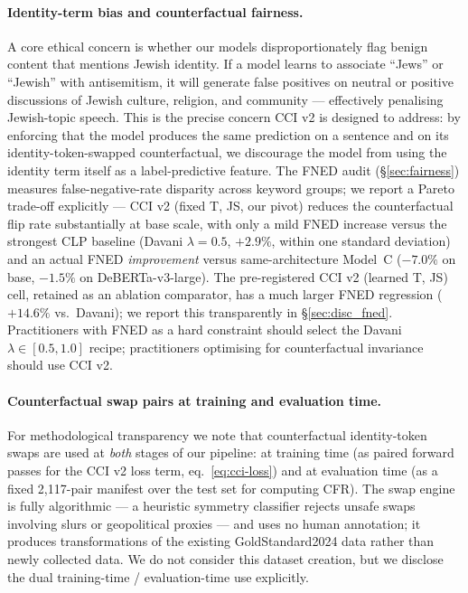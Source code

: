\paragraph{Identity-term bias and counterfactual fairness.}
A core ethical concern is whether our models disproportionately flag benign content that mentions Jewish identity. If a model learns to associate ``Jews'' or ``Jewish'' with antisemitism, it will generate false positives on neutral or positive discussions of Jewish culture, religion, and community --- effectively penalising Jewish-topic speech. This is the precise concern CCI v2 is designed to address: by enforcing that the model produces the same prediction on a sentence and on its identity-token-swapped counterfactual, we discourage the model from using the identity term itself as a label-predictive feature. The FNED audit (\S\ref{sec:fairness}) measures false-negative-rate disparity across keyword groups; we report a Pareto trade-off explicitly --- CCI v2 (fixed T, JS, our pivot) reduces the counterfactual flip rate substantially at base scale, with only a mild FNED increase versus the strongest CLP baseline (Davani $\lambda=0.5$, $+2.9\%$, within one standard deviation) and an actual FNED \emph{improvement} versus same-architecture Model~C ($-7.0\%$ on base, $-1.5\%$ on DeBERTa-v3-large). The pre-registered CCI v2 (learned T, JS) cell, retained as an ablation comparator, has a much larger FNED regression ($+14.6\%$ vs.\ Davani); we report this transparently in \S\ref{sec:disc_fned}. Practitioners with FNED as a hard constraint should select the Davani $\lambda \in [0.5, 1.0]$ recipe; practitioners optimising for counterfactual invariance should use CCI v2.

\paragraph{Counterfactual swap pairs at training and evaluation time.}
For methodological transparency we note that counterfactual identity-token swaps are used at \emph{both} stages of our pipeline: at training time (as paired forward passes for the CCI v2 loss term, eq.~\ref{eq:cci-loss}) and at evaluation time (as a fixed 2{,}117-pair manifest over the test set for computing CFR). The swap engine is fully algorithmic --- a heuristic symmetry classifier rejects unsafe swaps involving slurs or geopolitical proxies --- and uses no human annotation; it produces transformations of the existing GoldStandard2024 data rather than newly collected data. We do not consider this dataset creation, but we disclose the dual training-time / evaluation-time use explicitly.

